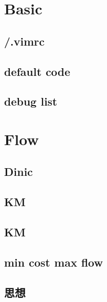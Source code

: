 \section{Basic}

% 
\subsection{/.vimrc}

\subsection{default code}

% 
\subsection{debug list}


\section{Flow}

\subsection{Dinic}

\subsection{KM}

\subsection{KM}

\subsection{min cost max flow}

\subsection{思想}

